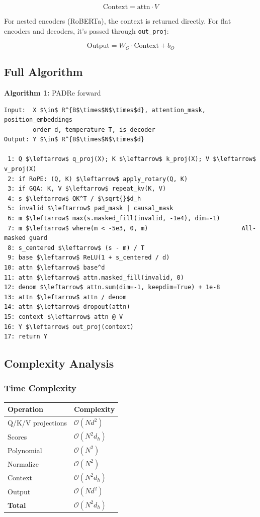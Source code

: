 \[
\text{Context} = \text{attn} \cdot V
\tag{4.11}
\]

For nested encoders (RoBERTa), the context is returned directly. For flat 
encoders and decoders, it's passed through \texttt{out\_proj}:

\[
\text{Output} = W_O \cdot \text{Context} + b_O
\tag{4.12}
\]

\subsection{Full Algorithm}

\textbf{Algorithm 1:} PADRe forward
\begin{lstlisting}
Input:  X $\in$ R^{B$\times$N$\times$d}, attention_mask, position_embeddings
        order d, temperature T, is_decoder
Output: Y $\in$ R^{B$\times$N$\times$d}

 1: Q $\leftarrow$ q_proj(X); K $\leftarrow$ k_proj(X); V $\leftarrow$ v_proj(X)
 2: if RoPE: (Q, K) $\leftarrow$ apply_rotary(Q, K)
 3: if GQA: K, V $\leftarrow$ repeat_kv(K, V)
 4: s $\leftarrow$ QK^T / $\sqrt{}$d_h
 5: invalid $\leftarrow$ pad_mask | causal_mask
 6: m $\leftarrow$ max(s.masked_fill(invalid, -1e4), dim=-1)
 7: m $\leftarrow$ where(m < -5e3, 0, m)                          All-masked guard
 8: s_centered $\leftarrow$ (s - m) / T
 9: base $\leftarrow$ ReLU(1 + s_centered / d)
10: attn $\leftarrow$ base^d
11: attn $\leftarrow$ attn.masked_fill(invalid, 0)
12: denom $\leftarrow$ attn.sum(dim=-1, keepdim=True) + 1e-8
13: attn $\leftarrow$ attn / denom
14: attn $\leftarrow$ dropout(attn)
15: context $\leftarrow$ attn @ V
16: Y $\leftarrow$ out_proj(context)
17: return Y
\end{lstlisting}

\subsection{Complexity Analysis}

\subsubsection{Time Complexity}

\begin{table}[H]
\centering
\small
\begin{tabular}{ll}
\toprule
\textbf{Operation} & \textbf{Complexity} \\
\midrule
Q/K/V projections & $\mathcal{O}(N d^2)$ \\
Scores & $\mathcal{O}(N^2 d_h)$ \\
Polynomial & $\mathcal{O}(N^2)$ \\
Normalize & $\mathcal{O}(N^2)$ \\
Context & $\mathcal{O}(N^2 d_h)$ \\
Output & $\mathcal{O}(N d^2)$ \\
\textbf{Total} & $\mathcal{O}(N^2 d_h)$ \\
\bottomrule
\end{tabular}
\end{table}

